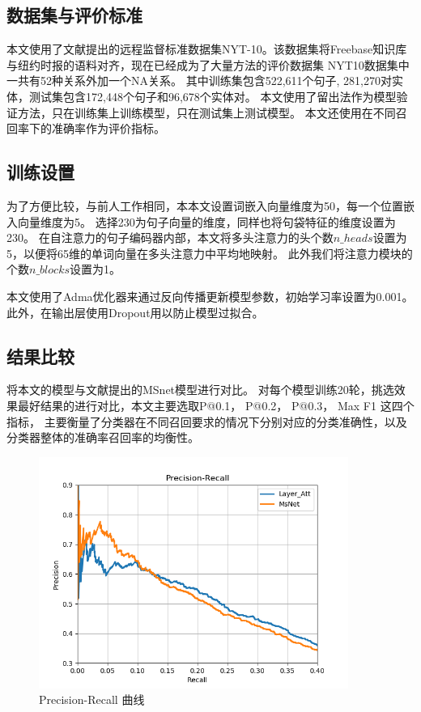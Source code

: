 \documentclass[UTF8]{csoarticle}
\begin{document}
\subsection{数据集与评价标准}
本文使用了文献\cite{bib2}提出的远程监督标准数据集NYT-10。该数据集将Freebase知识库与纽约时报的语料对齐，现在已经成为了大量方法的评价数据集
NYT10数据集中一共有52种关系外加一个NA关系。
其中训练集包含522,611个句子, 281,270对实体，测试集包含172,448个句子和96,678个实体对。
本文使用了留出法作为模型验证方法，只在训练集上训练模型，只在测试集上测试模型。
本文还使用在不同召回率下的准确率作为评价指标。

\subsection{训练设置}
为了方便比较，与前人工作相同，本本文设置词嵌入向量维度为50，每一个位置嵌入向量维度为5。
选择230为句子向量的维度，同样也将句袋特征的维度设置为230。
在自注意力的句子编码器内部，本文将多头注意力的头个数$n\_heads$设置为5，以便将65维的单词向量在多头注意力中平均地映射。
此外我们将注意力模块的个数$n\_blocks$设置为1。

本文使用了Adma优化器来通过反向传播更新模型参数，初始学习率设置为0.001。此外，在输出层使用Dropout用以防止模型过拟合。
\subsection{结果比较}
将本文的模型与文献\cite{bib11}提出的MSnet模型进行对比。
对每个模型训练20轮，挑选效果最好结果的进行对比，本文主要选取P@0.1， P@0.2， P@0.3， Max F1 这四个指标，
主要衡量了分类器在不同召回要求的情况下分别对应的分类准确性，以及分类器整体的准确率召回率的均衡性。

\begin{figure}[ht]
\centering
\includegraphics[width=0.9\textwidth]{pr_curve.png} 
\caption{Precision-Recall 曲线}
\label{fig:pr}
\end{figure}
\end{document}
